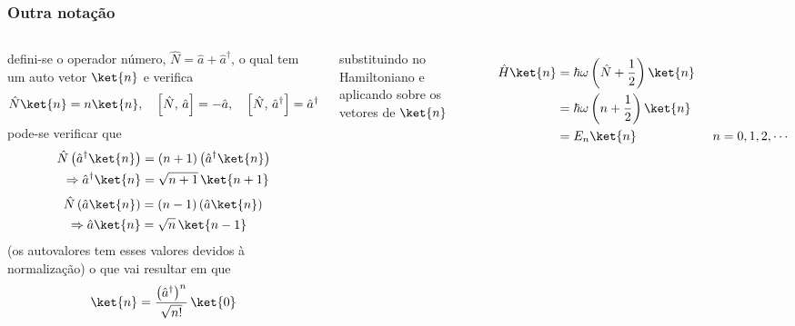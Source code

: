 \documentclass[12pt,brazil,table]{beamer}
\begin{document}
\begin{frame}
  \frametitle{Outra notação}
  \fontsize{7pt}{11pt}\selectfont
  
  \begin{columns}[T]
  defini-se o operador número, $\hat{N} = \hat{a} + \hat{a}^\dagger$, o qual tem um auto vetor $\ket{n}$ e verifica\vspace*{-0.25cm}
  \[
   \hat{N}\ket{n} = n\ket{n},\quad \left[ \hat{N},\, \hat{a}\right] = -\hat{a},\quad \left[ \hat{N},\, \hat{a}^\dagger\right] = \hat{a}^\dagger\vspace*{-0.25cm}
  \]
  pode-se verificar que\vspace*{-0.35cm}
  \[
    \begin{align*}
      \hat{N}\left(\hat{a}^\dagger \ket{n}\right) &= \left( n+1 \right)\left(\hat{a}^\dagger \ket{n}\right)\\
     \Rightarrow \hat{a}^\dagger \ket{n} &=\sqrt{n+1}\,\ket{n+1}\vspace*{-0.25cm}
    \end{align*}   
  \]\vspace*{-0.15cm}
  \[
    \begin{align*}
      \hat{N}\left(\hat{a} \ket{n}\right) &= \left( n-1 \right)\left(\hat{a} \ket{n}\right)\\
     \Rightarrow \hat{a} \ket{n} &=\sqrt{n}\,\ket{n-1}\vspace*{-0.25cm}
    \end{align*}   
  \]
  (os autovalores tem esses valores devidos à normalização) o que vai resultar em que\vspace*{-0.25cm}
  \[
    \ket{n} = \dfrac{\left( \hat{a}^\dagger \right)^n}{\sqrt{n!}}\,\ket{0} \vspace*{-0.25cm}
  \]

  substituindo no Hamiltoniano e aplicando sobre os vetores de $\ket{n}$
  
  \vspace*{-0.8cm}
  \[
    \begin{align*}
      \hat{H}\ket{n} &= \hbar\omega \left(\hat{N} + \dfrac{1}{2} \right)\ket{n}\\
      &= \hbar\omega \left (n + \dfrac{1}{2} \right)\ket{n}\\
      &= E_n\ket{n}\qquad\qquad\qquad n=0,1,2,\cdots
    \end{align*}\vspace*{-0.25cm}
  \]
  

\end{columns}
\end{frame}
\end{document}
